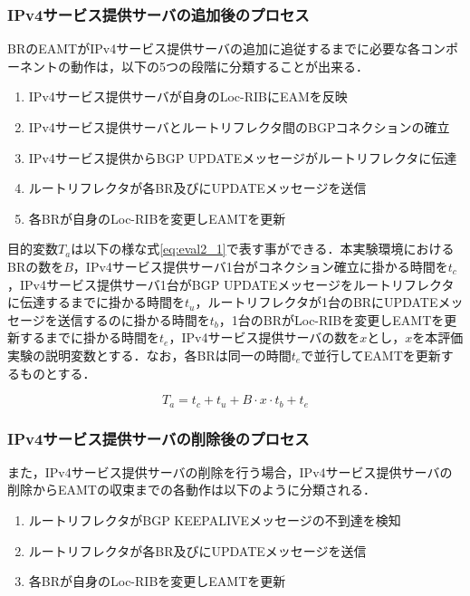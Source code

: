 \subsubsection{IPv4サービス提供サーバの追加後のプロセス}
BRのEAMTがIPv4サービス提供サーバの追加に追従するまでに必要な各コンポーネントの動作は，以下の5つの段階に分類することが出来る．

\begin{enumerate}
    \item IPv4サービス提供サーバが自身のLoc-RIBにEAMを反映
    \item IPv4サービス提供サーバとルートリフレクタ間のBGPコネクションの確立
    \item IPv4サービス提供からBGP UPDATEメッセージがルートリフレクタに伝達
    \item ルートリフレクタが各BR及びにUPDATEメッセージを送信
    \item 各BRが自身のLoc-RIBを変更しEAMTを更新
\end{enumerate}

目的変数$T_a$は以下の様な式\ref{eq:eval2_1}で表す事ができる．本実験環境におけるBRの数を$B$，IPv4サービス提供サーバ1台がコネクション確立に掛かる時間を$t_c$，IPv4サービス提供サーバ1台がBGP UPDATEメッセージをルートリフレクタに伝達するまでに掛かる時間を$t_u$，ルートリフレクタが1台のBRにUPDATEメッセージを送信するのに掛かる時間を$t_b$，1台のBRがLoc-RIBを変更しEAMTを更新するまでに掛かる時間を$t_e$，IPv4サービス提供サーバの数を$x$とし，$x$を本評価実験の説明変数とする．なお，各BRは同一の時間$t_e$で並行してEAMTを更新するものとする．

\begin{equation}
    T_a = t_c + t_u + B \cdot x \cdot t_b + t_e
    \label{eq:eval2_1}
\end{equation}

\subsubsection{IPv4サービス提供サーバの削除後のプロセス}
また，IPv4サービス提供サーバの削除を行う場合，IPv4サービス提供サーバの削除からEAMTの収束までの各動作は以下のように分類される．

\begin{enumerate}
    \item ルートリフレクタがBGP KEEPALIVEメッセージの不到達を検知
    \item ルートリフレクタが各BR及びにUPDATEメッセージを送信
    \item 各BRが自身のLoc-RIBを変更しEAMTを更新
\end{enumerate}

